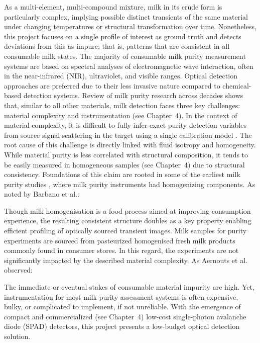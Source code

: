 \documentclass[12pt,a4paper,oneside]{report}
\begin{document}
As a multi-element, multi-compound mixture, milk in its crude form is particularly complex, implying possible distinct transients of the same material under changing temperatures or structural transformation over time. Nonetheless, this project focuses on a single profile of interest as ground truth and detects deviations from this as impure; that is, patterns that are consistent in all consumable milk states. The majority of consumable milk purity measurement systems are based on spectral analyses of electromagnetic wave interaction, often in the near-infrared (NIR), ultraviolet, and visible ranges. Optical detection approaches are preferred due to their less invasive nature compared to chemical-based detection systems. Review of milk purity research across decades shows that, similar to all other materials, milk detection faces three key challenges: material complexity and instrumentation (see Chapter~4). In the context of material complexity, it is difficult to fully infer exact purity detection variables from source signal scattering in the target using a single calibration model \cite{aernouts2015,melfsen2012}. The root cause of this challenge is directly linked with fluid isotropy and homogeneity. While material purity is less correlated with structural composition, it tends to be easily measured in homogeneous samples (see Chapter~4) due to structural consistency. Foundations of this claim are rooted in some of the earliest milk purity studies \cite{chandra2024}, where milk purity instruments had homogenizing components. As noted by Barbano et al.:

\noindent\quotesix

Though milk homogenisation is a food process aimed at improving consumption experience, the resulting consistent structure doubles as a key property enabling efficient profiling of optically sourced transient images. Milk samples for purity experiments are sourced from pasteurized homogenised fresh milk products commonly found in consumer stores. In this regard, the experiments are not significantly impacted by the described material complexity. As Aernouts et al. observed:

\noindent\quoteseven

The immediate or eventual stakes of consumable material impurity are high. Yet, instrumentation for most milk purity assessment systems is often expensive, bulky, or complicated to implement, if not unreliable. With the emergence of compact and commercialized (see Chapter~4) low-cost single-photon avalanche diode (SPAD) detectors, this project presents a low-budget optical detection solution.
\end{document}
